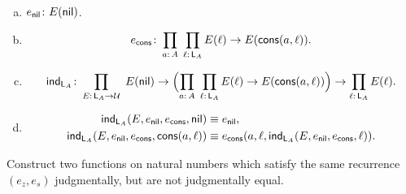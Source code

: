 \begin{solution}\ 
    \begin{enumerate}[a)]
        \item $e_{\fun{nil}}\colon E(\fun{nil})$.
        
        \item
            \[
                e_{\fun{cons}}\colon
                    \prod_{a\colon A}\;
                    \prod_{\ell\colon\fun L_A}
                        E(\ell)\to E(\fun{cons}(a,\ell)).
            \]
        
        \item
            \[
                \fun{ind}_{\fun L_A}\colon
                    \prod_{E\colon\fun L_A\to\univ}\;
                    E(\fun{nil})
                    \to
                    \Bigl(
                    \prod_{a\colon A}\;
                    \prod_{\ell\colon\fun L_A}
                        E(\ell)\to E(\fun{cons}(a,\ell))
                    \Bigr)
                    \to
                    \prod_{\ell\colon\fun L_A}E(\ell).
            \]
        
        \item
            \begin{align*}
                \mathsf{ind}_{\mathsf{L}_A}
                    (
                        E,
                        e_{\mathsf{nil}},
                        e_{\mathsf{cons}},
                        \mathsf{nil}
                    )
                    &\equiv e_{\mathsf{nil}},\\
                \mathsf{ind}_{\mathsf{L}_A}
                    (
                        E,
                        e_{\mathsf{nil}},
                        e_{\mathsf{cons}},
                        \mathsf{cons}(a,\ell)
                    )
                    &\equiv e_{\mathsf{cons}}
                        (
                            a,
                            \ell,
                            \mathsf{ind}_{\mathsf{L}_A}
                                (
                                    E,
                                    e_{\mathsf{nil}},
                                    e_{\mathsf{cons}},
                                    \ell
                                )
                        ).
            \end{align*}
    \end{enumerate}
    
\end{solution}

\begin{exr}
    Construct two functions on natural numbers which satisfy the same recurrence\/ $(e_z, e_s)$ judgmentally, but are not judgmentally equal.
\end{exr}

